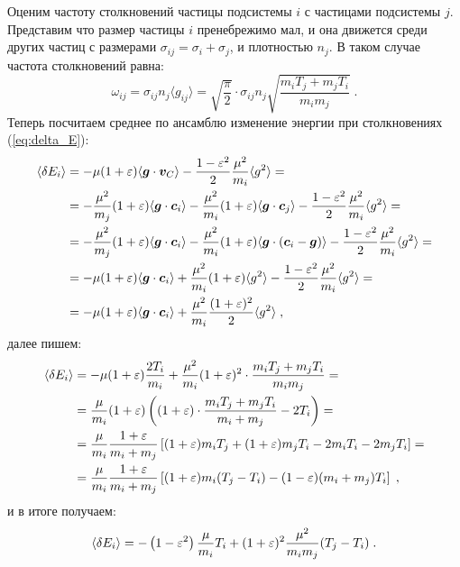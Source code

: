 Оценим частоту столкновений частицы подсистемы $i$ с частицами подсистемы $j$. Представим что размер частицы $i$ пренебрежимо
мал, и она движется среди других частиц с размерами $\sigma_{ij}=\sigma_i+\sigma_j$, и плотностью $n_j$. В таком случае частота
столкновений равна:
\begin{equation}
  \omega_{ij} = \sigma_{ij}n_j\langle g_{ij}\rangle=\sqrt{\frac{\pi}{2}}\cdot\sigma_{ij}n_j\sqrt{\frac{m_iT_j+m_jT_i}{m_im_j}}\;.
\end{equation}
Теперь посчитаем среднее по ансамблю изменение энергии при столкновениях
(\ref{eq:delta_E}):
\begin{equation}
  \begin{split}
    \langle\delta E_i\rangle &= -\mu(1+\varepsilon)\langle \bm{g}\cdot\bm{v}_C\rangle-\frac{1-\varepsilon^2}{2}\frac{\mu^2}{m_i}\langle g^2\rangle=\\
    &=-\frac{\mu^2}{m_j}(1+\varepsilon)\langle \bm{g}\cdot\bm{c}_i\rangle-\frac{\mu^2}{m_i}(1+\varepsilon)\langle \bm{g}\cdot\bm{c}_j\rangle
    -\frac{1-\varepsilon^2}{2}\frac{\mu^2}{m_i}\langle g^2\rangle = \\
    &=-\frac{\mu^2}{m_j}(1+\varepsilon)\langle \bm{g}\cdot\bm{c}_i\rangle-\frac{\mu^2}{m_i}(1+\varepsilon)\langle \bm{g}\cdot(\bm{c}_i-\bm{g})\rangle
    -\frac{1-\varepsilon^2}{2}\frac{\mu^2}{m_i}\langle g^2\rangle = \\
    &=-\mu(1+\varepsilon)\langle \bm{g}\cdot\bm{c}_i\rangle+\frac{\mu^2}{m_i}(1+\varepsilon)\langle g^2\rangle
    -\frac{1-\varepsilon^2}{2}\frac{\mu^2}{m_i}\langle g^2\rangle = \\
    &=-\mu(1+\varepsilon)\langle \bm{g}\cdot\bm{c}_i\rangle+\frac{\mu^2}{m_i}\frac{(1+\varepsilon)^2}{2}\langle g^2\rangle \;,
  \end{split}
\end{equation}
далее пишем:
\begin{equation}
  \begin{split}
    \langle\delta E_i\rangle &=-\mu(1+\varepsilon)\frac{2T_i}{m_i}+\frac{\mu^2}{m_i}(1+\varepsilon)^2\cdot\frac{m_iT_j+m_jT_i}{m_im_j}=\\
    &=\frac{\mu}{m_i}(1+\varepsilon)\left((1+\varepsilon)\cdot\frac{m_iT_j+m_jT_i}{m_i+m_j}-2T_i\right)=\\
    &=\frac{\mu}{m_i}\frac{1+\varepsilon}{m_i+m_j}\left[(1+\varepsilon)m_iT_j+(1+\varepsilon)m_jT_i-2m_iT_i-2m_jT_i\right]=\\
    &=\frac{\mu}{m_i}\frac{1+\varepsilon}{m_i+m_j}\left[(1+\varepsilon)m_i(T_j-T_i)-(1-\varepsilon)(m_i+m_j)T_i\right]\;,
  \end{split}
\end{equation}
и в итоге получаем:
\begin{equation}
  \langle\delta E_i\rangle = -\left(1-\varepsilon^2\right)\frac{\mu}{m_i}T_i+(1+\varepsilon)^2\frac{\mu^2}{m_im_j}(T_j-T_i)\;.
\end{equation}
